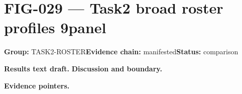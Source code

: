 \clearpage
\section{FIG-029 --- Task2 broad roster profiles 9panel}
\label{figpage:fig-029}
\textbf{Group:} TASK2-ROSTER\quad \textbf{Evidence chain:} manifested\quad \textbf{Status:} comparison

\textbf{Results text draft.} 
\textbf{Discussion and boundary.} 


\textbf{Evidence pointers.}



\vfill
